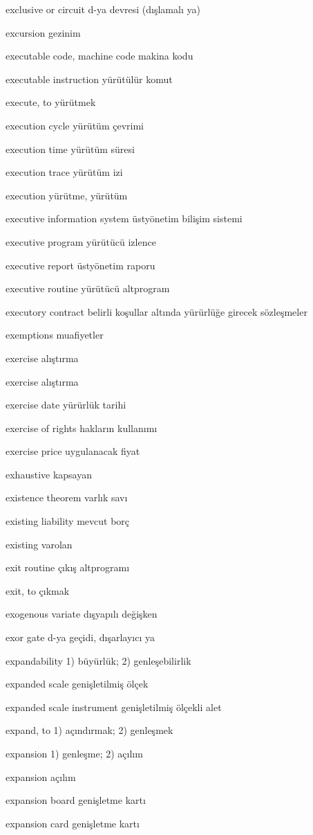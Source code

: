 \documentclass[12pt,fleqn]{article}\usepackage{../../common}
\begin{document}
exclusive or circuit d-ya devresi (dışlamalı ya)

excursion gezinim

executable code, machine code makina kodu

executable instruction yürütülür komut

execute, to yürütmek

execution cycle yürütüm çevrimi

execution time yürütüm süresi

execution trace yürütüm izi

execution yürütme, yürütüm

executive information system üstyönetim bilişim sistemi

executive program yürütücü izlence

executive report üstyönetim raporu

executive routine yürütücü altprogram

executory contract belirli koşullar altında yürürlüğe girecek sözleşmeler

exemptions muafiyetler

exercise alıştırma

exercise alıştırma

exercise date yürürlük tarihi

exercise of rights hakların kullanımı

exercise price uygulanacak fiyat

exhaustive kapsayan

existence theorem varlık savı

existing liability mevcut borç

existing varolan

exit routine çıkış altprogramı

exit, to çıkmak

exogenous variate dışyapılı değişken

exor gate d-ya geçidi, dışarlayıcı ya

expandability 1) büyürlük; 2) genleşebilirlik

expanded scale genişletilmiş ölçek

expanded scale instrument genişletilmiş ölçekli alet

expand, to 1) açındırmak; 2) genleşmek

expansion 1) genleşme; 2) açılım

expansion açılım

expansion board genişletme kartı

expansion card genişletme kartı
\end{document}
